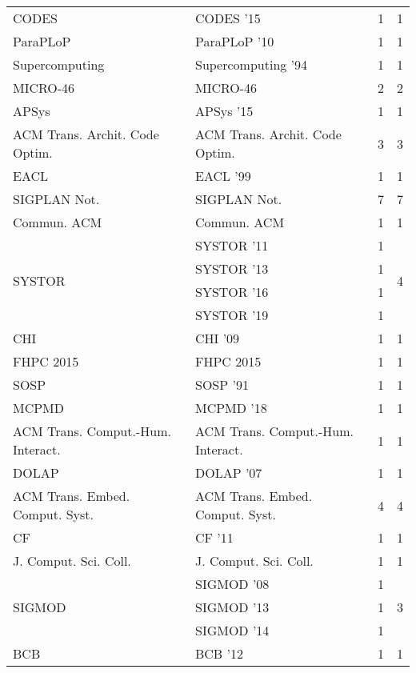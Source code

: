 \begin{table*}[t]
\begin{tabular}{llrr}
\multirow{1}{*}{CODES } & CODES '15 & 1 & \multirow{1}{*}{1}\\
\multirow{1}{*}{ParaPLoP } & ParaPLoP '10 & 1 & \multirow{1}{*}{1}\\
\multirow{1}{*}{Supercomputing } & Supercomputing '94 & 1 & \multirow{1}{*}{1}\\
\multirow{1}{*}{MICRO-46} & MICRO-46 & 2 & \multirow{1}{*}{2}\\
\multirow{1}{*}{APSys } & APSys '15 & 1 & \multirow{1}{*}{1}\\
\multirow{1}{*}{ACM Trans. Archit. Code Optim.} & ACM Trans. Archit. Code Optim. & 3 & \multirow{1}{*}{3}\\
\multirow{1}{*}{EACL } & EACL '99 & 1 & \multirow{1}{*}{1}\\
\multirow{1}{*}{SIGPLAN Not.} & SIGPLAN Not. & 7 & \multirow{1}{*}{7}\\
\multirow{1}{*}{Commun. ACM} & Commun. ACM & 1 & \multirow{1}{*}{1}\\
\multirow{4}{*}{SYSTOR } & SYSTOR '11 & 1 & \multirow{4}{*}{4}\\
& SYSTOR '13 & 1 &\\
& SYSTOR '16 & 1 &\\
& SYSTOR '19 & 1 &\\
\multirow{1}{*}{CHI } & CHI '09 & 1 & \multirow{1}{*}{1}\\
\multirow{1}{*}{FHPC 2015} & FHPC 2015 & 1 & \multirow{1}{*}{1}\\
\multirow{1}{*}{SOSP } & SOSP '91 & 1 & \multirow{1}{*}{1}\\
\multirow{1}{*}{MCPMD } & MCPMD '18 & 1 & \multirow{1}{*}{1}\\
\multirow{1}{*}{ACM Trans. Comput.-Hum. Interact.} & ACM Trans. Comput.-Hum. Interact. & 1 & \multirow{1}{*}{1}\\
\multirow{1}{*}{DOLAP } & DOLAP '07 & 1 & \multirow{1}{*}{1}\\
\multirow{1}{*}{ACM Trans. Embed. Comput. Syst.} & ACM Trans. Embed. Comput. Syst. & 4 & \multirow{1}{*}{4}\\
\multirow{1}{*}{CF } & CF '11 & 1 & \multirow{1}{*}{1}\\
\multirow{1}{*}{J. Comput. Sci. Coll.} & J. Comput. Sci. Coll. & 1 & \multirow{1}{*}{1}\\
\multirow{3}{*}{SIGMOD } & SIGMOD '08 & 1 & \multirow{3}{*}{3}\\
& SIGMOD '13 & 1 &\\
& SIGMOD '14 & 1 &\\
\multirow{1}{*}{BCB } & BCB '12 & 1 & \multirow{1}{*}{1}\\

\end{tabular}
\end{table*}
